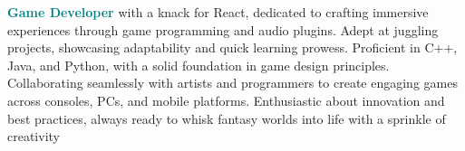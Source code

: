 \begin{minipage}[t]{1\textwidth}

\textcolor{teal}{\bf Game Developer} with a knack for React, dedicated to crafting immersive experiences through game programming and audio plugins. Adept at juggling projects, showcasing adaptability and quick learning prowess. Proficient in C++, Java, and Python, with a solid foundation in game design principles. Collaborating seamlessly with artists and programmers to create engaging games across consoles, PCs, and mobile platforms. Enthusiastic about innovation and best practices, always ready to whisk fantasy worlds into life with a sprinkle of creativity
\end{minipage}\\
